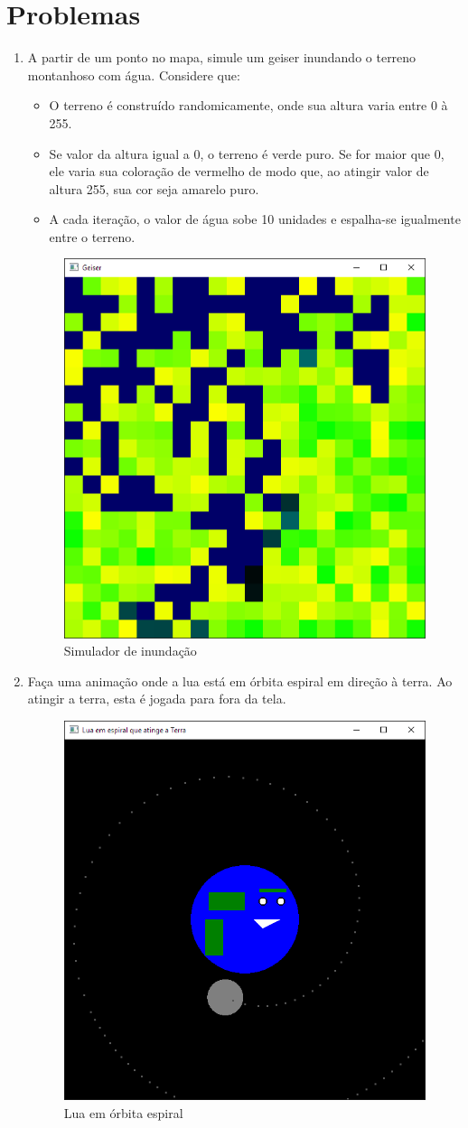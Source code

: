 \section*{Problemas}
\begin{enumerate}
\item
  A partir de um ponto no mapa, simule um geiser inundando o terreno montanhoso com água. Considere que:
  \begin{itemize}
  	\item O terreno é construído randomicamente, onde sua altura varia entre 0 à 255.
  	\item Se valor da altura igual a 0, o terreno é verde puro. Se for maior que 0, ele varia sua coloração de vermelho de modo que, ao atingir valor de altura 255, sua cor seja amarelo puro.
  	\item A cada iteração, o valor de água sobe 10 unidades e espalha-se igualmente entre o terreno.
  \end{itemize}
  \label{ex:cap05_ex1}

  \begin{figure}[H]
    \centerline{\includegraphics[width=.5\textwidth]{img/cap5_ex18.png}}
    \caption{Simulador de inundação}
    \label{fig:cap04_ex1}
  \end{figure}

\item
	Faça uma animação onde a lua está em órbita espiral em direção à terra. Ao atingir a terra, esta é jogada para fora da tela.
\label{ex:cap05_ex2}

  \begin{figure}[ht]
    \centerline{\includegraphics[width=.5\textwidth]{img/cap5_ex19.png}}
    \caption{Lua em órbita espiral}
    \label{fig:cap04_ex1}
  \end{figure}


\end{enumerate}
